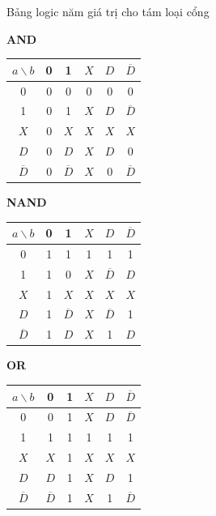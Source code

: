\begin{frame}{Bảng logic năm giá trị cho tám loại cổng}
\centering\scriptsize
\renewcommand{\arraystretch}{1.05}
\setlength{\tabcolsep}{3pt}
\begin{minipage}[t]{0.24\textwidth}\centering
\textbf{AND}\\[1pt]
\begin{tabular}{@{}c|ccccc@{}}
$a\backslash b$ & 0 & 1 & $X$ & $D$ & $\overline{D}$\\\hline
0 & 0 & 0 & 0 & 0 & 0\\
1 & 0 & 1 & $X$ & $D$ & $\overline{D}$\\
$X$ & 0 & $X$ & $X$ & $X$ & $X$\\
$D$ & 0 & $D$ & $X$ & $D$ & 0\\
$\overline{D}$ & 0 & $\overline{D}$ & $X$ & 0 & $\overline{D}$\\
\end{tabular}
\end{minipage}\hfill
\begin{minipage}[t]{0.24\textwidth}\centering
\textbf{NAND}\\[1pt]
\begin{tabular}{@{}c|ccccc@{}}
$a\backslash b$ & 0 & 1 & $X$ & $D$ & $\overline{D}$\\\hline
0 & 1 & 1 & 1 & 1 & 1\\
1 & 1 & 0 & $X$ & $\overline{D}$ & $D$\\
$X$ & 1 & $X$ & $X$ & $X$ & $X$\\
$D$ & 1 & $\overline{D}$ & $X$ & $\overline{D}$ & 1\\
$\overline{D}$ & 1 & $D$ & $X$ & 1 & $D$\\
\end{tabular}
\end{minipage}\hfill
\begin{minipage}[t]{0.24\textwidth}\centering
\textbf{OR}\\[1pt]
\begin{tabular}{@{}c|ccccc@{}}
$a\backslash b$ & 0 & 1 & $X$ & $D$ & $\overline{D}$\\\hline
0 & 0 & 1 & $X$ & $D$ & $\overline{D}$\\
1 & 1 & 1 & 1 & 1 & 1\\
$X$ & $X$ & 1 & $X$ & $X$ & $X$\\
$D$ & $D$ & 1 & $X$ & $D$ & 1\\
$\overline{D}$ & $\overline{D}$ & 1 & $X$ & 1 & $\overline{D}$\\
\end{tabular}

\end{minipage}
\end{frame}
